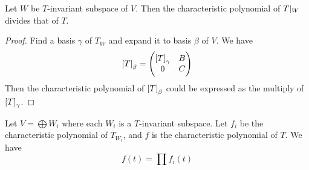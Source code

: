 \begin{theorem}\label{split_of_invariant_subspace}
    Let $W$ be $T$-invariant subspace of $V$. Then the characteristic polynomial of ${T}|_{W}$ divides that of $T$.    
\end{theorem}
\begin{proof}
    Find a basis $\gamma$ of $T_W$ and expand it to basis $\beta$ of $V$. We have 
    \begin{equation*}
        \coordinate{T}_\beta = \begin{pmatrix}
            \coordinate{T}_\gamma & B \\
            0 & C        
        \end{pmatrix}
    \end{equation*}
    Then the characteristic polynomial of $\coordinate{T}_\beta$ could be expressed as the multiply of $\coordinate{T}_\gamma$.
\end{proof}

\begin{theorem}
    Let $V = \bigoplus W_i$ where each $W_i$ is a $T$-invariant subspace. Let $f_i$ be the characteristic polynomial of $T_{W_i}$, and $f$ is the characteristic polynomial of $T$. We have 
    \begin{equation}
        f(t) = \prod f_i (t)
    \end{equation}
\end{theorem}



